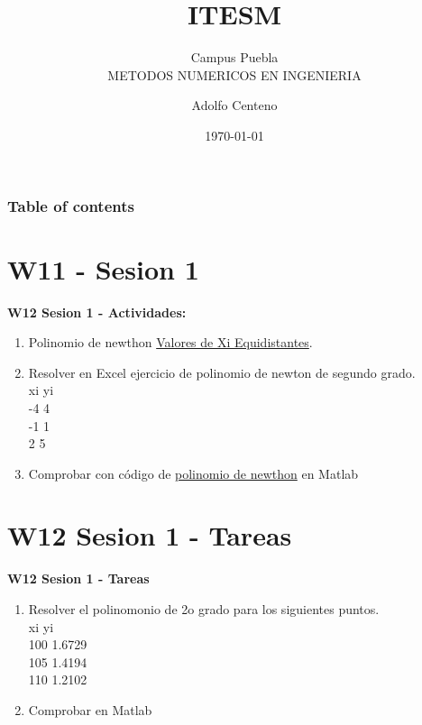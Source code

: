 \documentclass{beamer}
\begin{document}
\title{ITESM}  
\subtitle{Campus Puebla\\METODOS NUMERICOS EN INGENIERIA
}
\author{Adolfo Centeno}
\date{\today} 


\begin{frame}
\titlepage
\end{frame}

\begin{frame}\frametitle{Table of contents}
\tableofcontents
\end{frame} 


\section{W11 - Sesion 1 }

\begin{frame}

\textbf{W12 Sesion 1 - Actividades:}

\begin{enumerate}
\item
	 Polinomio de newthon \href{https://www.youtube.com/watch?v=WgZvz57c5CQ}{Valores de Xi Equidistantes}.

\item
	Resolver en Excel  ejercicio de polinomio de newton de segundo grado. \\
	
	xi	yi \\
-4	4 \\
-1	1 \\
2	5

\item Comprobar con código de \href{https://github.com/adsoftsito/metodos-numericos/blob/master/w12/polinomionewthon/polnewton.pdf}{polinomio de newthon} en Matlab
\end{enumerate} 

\end{frame}


\section{W12 Sesion 1 - Tareas }

\begin{frame}


\textbf{W12 Sesion 1 - Tareas}


\begin{enumerate}
\item

Resolver el polinomonio de 2o grado para los siguientes puntos. \\

xi	yi \\
100	1.6729 \\
105	1.4194 \\
110	1.2102

\item
	Comprobar en Matlab


\end{enumerate} 


\end{frame}
\end{document}
